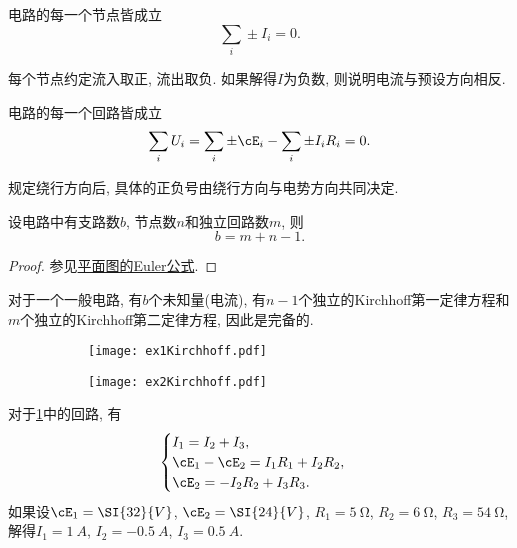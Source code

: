 \documentclass[../Electromagnetism.tex]{subfiles}
\begin{document}
\begin{finale}
	\begin{corollary}[Kirchhoff第一定律]
		电路的每一个节点皆成立
		\[ \sum_i \pm I_i = 0. \]
	\end{corollary}
\end{finale}
\begin{remark}
	每个节点约定流入取正, 流出取负. 如果解得$I$为负数, 则说明电流与预设方向相反.
\end{remark}
\begin{finale}
	\begin{corollary}[Kirchhoff第二定律]
		电路的每一个回路皆成立
		\[ \sum_i U_i = \sum_i \pm\cE_i - \sum_i \pm I_i R_i = 0. \]
	\end{corollary}
\end{finale}
\begin{remark}
	规定绕行方向后, 具体的正负号由绕行方向与电势方向共同决定.
\end{remark}
\begin{theorem}[电路的Euler公式]
	设电路中有支路数$b$, 节点数$n$和独立回路数$m$, 则
	\[ b = m + n - 1. \]
\end{theorem}
\begin{proof}
	参见\href{https://en.wikipedia.org/wiki/Planar_graph#Euler's_formula}{平面图的Euler公式}.
\end{proof}
对于一个一般电路, 有$b$个未知量(电流), 有$n-1$个独立的Kirchhoff第一定律方程和$m$个独立的Kirchhoff第二定律方程, 因此是完备的.
\begin{figure}
	\centering
	\begin{subfigure}[b]{.45\textwidth}
		\centering
		\texttt{[image: ex1Kirchhoff.pdf]}
		\caption{}
		\label{fig:Kirchhoff方程组求解示例1}
	\end{subfigure}
	\begin{subfigure}[b]{.45\textwidth}
		\centering
		\texttt{[image: ex2Kirchhoff.pdf]}
		\caption{}
		\label{fig:Kirchhoff方程组求解示例2}
	\end{subfigure}
	\caption{}
\end{figure}
\begin{ex}
	对于\cref{fig:Kirchhoff方程组求解示例1}中的回路, 有
	\[ \begin{cases}
		I_1 = I_2 + I_3,\\
		\cE_1 - \cE_2 = I_1 R_1 + I_2 R_2,\\
		\cE_2 = -I_2 R_2 + I_3 R_3.
	\end{cases} \]
	如果设$\cE_1 = \SI{32}{V}$, $\cE_2 = \SI{24}{V}$, $R_1 = \SI{5}{\ohm}$, $R_2 = \SI{6}{\ohm}$, $R_3 = \SI{54}{\ohm}$, 解得$I_1 = \SI{1}{A}$, $I_2 = \SI{-0.5}{A}$, $I_3 = \SI{0.5}{A}$.
\end{ex}
\end{document}
